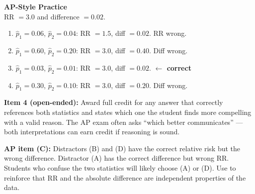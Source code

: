 \documentclass[10pt]{article}
\begin{document}
\vspace{0.18in}

\begin{tcolorbox}[colback=redbg, colframe=redacc, boxrule=0.8pt, arc=2mm,
    left=4mm, right=4mm, top=3mm, bottom=3mm]
\small\textbf{AP-Style Practice}\\[6pt]
RR $= 3.0$ and difference $= 0.02$.

\begin{enumerate}[label=\textbf{(\Alph*)}, leftmargin=2em, itemsep=6pt]
  \item $\hat{p}_1 = 0.06$, $\hat{p}_2 = 0.04$: RR $= 1.5$, diff $= 0.02$. RR wrong.
  \item $\hat{p}_1 = 0.60$, $\hat{p}_2 = 0.20$: RR $= 3.0$, diff $= 0.40$. Diff wrong.
  \item $\hat{p}_1 = 0.03$, $\hat{p}_2 = 0.01$: RR $= 3.0$, diff $= 0.02$.
        \textcolor{keyred}{\textbf{$\leftarrow$ correct}}
  \item $\hat{p}_1 = 0.30$, $\hat{p}_2 = 0.10$: RR $= 3.0$, diff $= 0.20$. Diff wrong.
\end{enumerate}

\vspace{6pt}
\end{tcolorbox}

\begin{teachernote}
\textbf{Item 4 (open-ended):} Award full credit for any answer that correctly references
both statistics and states which one the student finds more compelling with a valid reason.
The AP exam often asks ``which better communicates'' --- both interpretations can earn credit
if reasoning is sound.

\textbf{AP item (C):} Distractors (B) and (D) have the correct relative risk but the wrong
difference. Distractor (A) has the correct difference but wrong RR. Students who confuse the
two statistics will likely choose (A) or (D). Use to reinforce that RR and the absolute
difference are independent properties of the data.
\end{teachernote}
\end{document}
